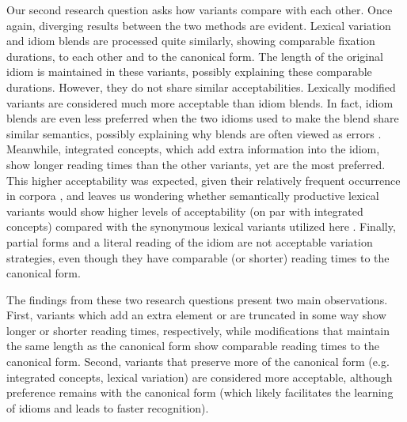 \documentclass[output=paper
,modfonts
,nonflat]{langsci/langscibook}
\begin{document}
Our second research question asks how variants compare with each other. Once again, diverging results between the two methods are evident.  Lexical variation and idiom blends are processed quite similarly, showing comparable fixation durations, to each other and to the canonical form. The length of the original idiom is maintained in these variants, possibly explaining these comparable durations. However, they do not share similar acceptabilities. Lexically modified variants are considered much more acceptable than idiom blends. In fact, idiom blends are even less preferred when the two idioms used to make the blend share similar semantics, possibly explaining why blends are often viewed as errors \citep{Fay1982, CuttingBock1997}. Meanwhile, integrated concepts, which add extra information into the idiom, show longer reading times than the other variants, yet are the most preferred. This higher acceptability was expected, given their relatively frequent occurrence in corpora \citep{Moon1998, Schroder2013}, and leaves us wondering whether semantically productive lexical variants \citep[cf.][]{McGloneEtAl1994} would show higher levels of acceptability (on par with integrated concepts) compared with the synonymous lexical variants utilized here \citep[following][]{GibbsEtAl1989}. Finally, partial forms and a literal reading of the idiom are not acceptable variation strategies, even though they have comparable (or shorter) reading times to the canonical form.

The findings from these two research questions present two main observations. First, variants which add an extra element or are truncated in some way show longer or shorter reading times, respectively, while modifications that maintain the same length as the canonical form show comparable reading times to the canonical form. Second, variants that preserve more of the canonical form (e.g. integrated concepts, lexical variation) are considered more acceptable, although preference remains with the canonical form (which likely facilitates the learning of idioms and leads to faster recognition).
\end{document}
